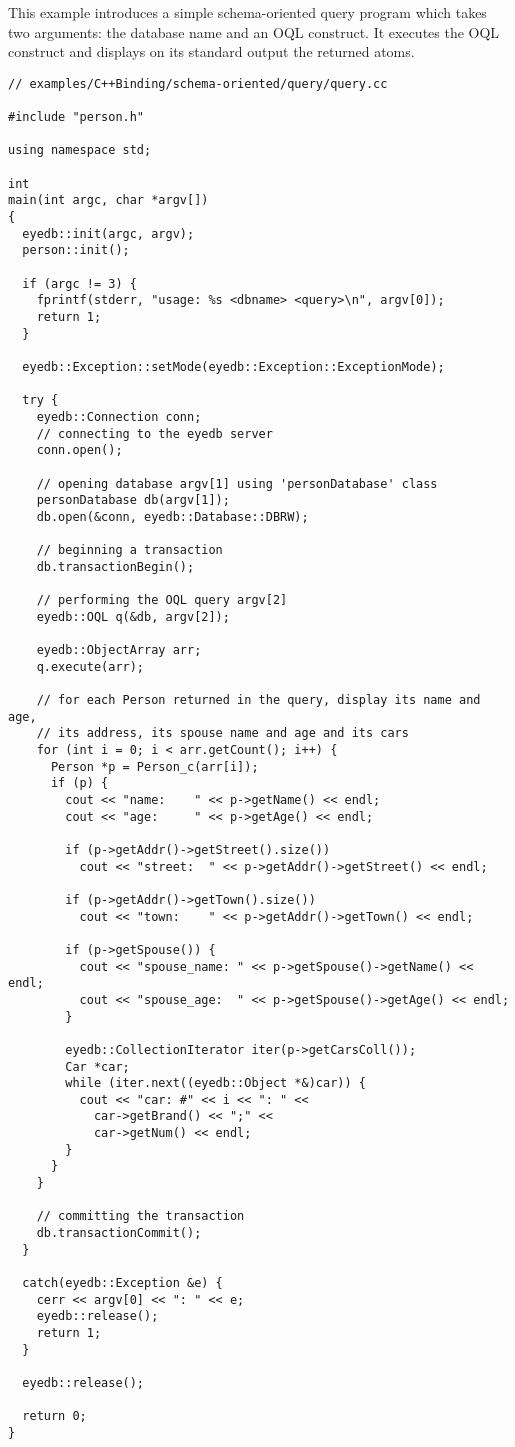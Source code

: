 \normalsize
{}
This example introduces a simple schema-oriented query program which takes
two arguments: the database name and an OQL construct. It executes
the OQL construct and displays on its standard output the returned
atoms.
\verbsize
\begin{verbatim}
// examples/C++Binding/schema-oriented/query/query.cc

#include "person.h"

using namespace std;

int
main(int argc, char *argv[])
{
  eyedb::init(argc, argv);
  person::init();

  if (argc != 3) {
    fprintf(stderr, "usage: %
    return 1;
  }

  eyedb::Exception::setMode(eyedb::Exception::ExceptionMode);

  try {
    eyedb::Connection conn;
    // connecting to the eyedb server
    conn.open();

    // opening database argv[1] using 'personDatabase' class
    personDatabase db(argv[1]);
    db.open(&conn, eyedb::Database::DBRW);

    // beginning a transaction
    db.transactionBegin();

    // performing the OQL query argv[2]
    eyedb::OQL q(&db, argv[2]);

    eyedb::ObjectArray arr;
    q.execute(arr);

    // for each Person returned in the query, display its name and age,
    // its address, its spouse name and age and its cars
    for (int i = 0; i < arr.getCount(); i++) {
      Person *p = Person_c(arr[i]);
      if (p) {
        cout << "name:    " << p->getName() << endl;
        cout << "age:     " << p->getAge() << endl;

        if (p->getAddr()->getStreet().size())
          cout << "street:  " << p->getAddr()->getStreet() << endl;

        if (p->getAddr()->getTown().size())
          cout << "town:    " << p->getAddr()->getTown() << endl;

        if (p->getSpouse()) {
          cout << "spouse_name: " << p->getSpouse()->getName() << endl;
          cout << "spouse_age:  " << p->getSpouse()->getAge() << endl;
        }

        eyedb::CollectionIterator iter(p->getCarsColl());
        Car *car;
        while (iter.next((eyedb::Object *&)car)) {
          cout << "car: #" << i << ": " <<
            car->getBrand() << ";" <<
            car->getNum() << endl;
        }
      }
    }

    // committing the transaction
    db.transactionCommit();
  }

  catch(eyedb::Exception &e) {
    cerr << argv[0] << ": " << e;
    eyedb::release();
    return 1;
  }

  eyedb::release();

  return 0;
}
\end{verbatim}
